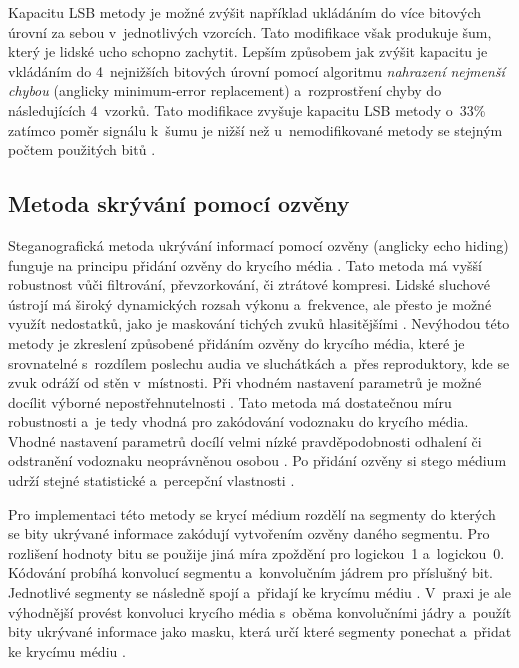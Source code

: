 Kapacitu LSB metody je možné zvýšit například ukládáním do více bitových úrovní
za sebou v~jednotlivých vzorcích. Tato modifikace však produkuje šum, který je
lidské ucho schopno zachytit. Lepším způsobem jak zvýšit kapacitu je vkládáním
do 4~nejnižších bitových úrovní pomocí algoritmu \textit{nahrazení nejmenší
chybou} (anglicky minimum-error replacement) a~rozprostření chyby do
následujících 4~vzorků. Tato modifikace zvyšuje kapacitu LSB metody o~33\%
zatímco poměr signálu k~šumu je nižší než u~nemodifikované metody se stejným
počtem použitých bitů \cite{Cvejic2002}.

\subsection*{Metoda skrývání pomocí ozvěny}
\label{sub:echo-hiding}

Steganografická metoda ukrývání informací pomocí ozvěny (anglicky echo hiding)
funguje na principu přidání ozvěny do krycího média \cite{Djebbar2012}. Tato
metoda má vyšší robustnost vůči filtrování, převzorkování, či ztrátové
kompresi. Lidské sluchové ústrojí má široký dynamických rozsah výkonu
a~frekvence, ale přesto je možné využít nedostatků, jako je maskování tichých
zvuků hlasitějšími \cite{Gruhl1996}. Nevýhodou této metody je zkreslení
způsobené přidáním ozvěny do krycího média, které je srovnatelné s~rozdílem
poslechu audia ve sluchátkách a~přes reproduktory, kde se zvuk odráží od stěn
v~místnosti. Při vhodném nastavení parametrů je možné docílit výborné
nepostřehnutelnosti \cite{Gruhl1996}. Tato metoda má dostatečnou míru
robustnosti a~je tedy vhodná pro zakódování vodoznaku do krycího média. Vhodné
nastavení parametrů docílí velmi nízké pravděpodobnosti odhalení či odstranění
vodoznaku neoprávněnou osobou \cite{Gruhl1996}. Po přidání ozvěny si stego
médium udrží stejné statistické a~percepční vlastnosti \cite{Djebbar2012}.

Pro implementaci této metody se krycí médium rozdělí na segmenty do kterých se
bity ukrývané informace zakódují vytvořením ozvěny daného segmentu. Pro
rozlišení hodnoty bitu se použije jiná míra zpoždění pro logickou~1
a~logickou~0. Kódování probíhá konvolucí segmentu a~konvolučním jádrem pro
příslušný bit. Jednotlivé segmenty se následně spojí a~přidají ke krycímu médiu
\cite{Gruhl1996}. V~praxi je ale výhodnější provést konvoluci krycího média
s~oběma konvolučními jádry a~použít bity ukrývané informace jako masku, která
určí které segmenty ponechat a~přidat ke krycímu médiu \cite{Gruhl1996}.

